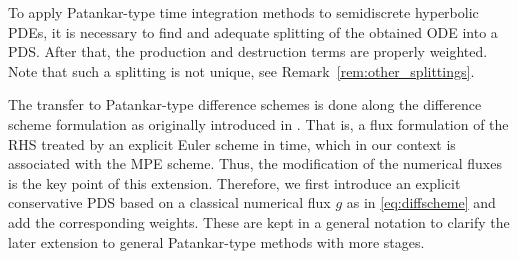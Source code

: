 \documentclass[final,11pt, times, linenumber, nopreprintline]{elsarticle}
\begin{document}
To apply Patankar-type time integration methods to semidiscrete hyperbolic PDEs, it is necessary to find and adequate splitting of the obtained ODE into a PDS. After that, the production and destruction terms are properly weighted. Note that such a splitting is not unique, see Remark~\ref{rem:other_splittings}. %

The transfer to Patankar-type difference schemes is done along the difference scheme formulation as originally introduced in \cite{lax_systems_1960}. That is, a flux formulation of the RHS treated by an explicit Euler scheme in time, which in our context is associated with the MPE scheme. Thus, the modification of the numerical fluxes is the key point of this extension.
Therefore, we first introduce an explicit conservative PDS based on a classical numerical flux $g$ as in \eqref{eq:diffscheme} and add the corresponding weights. These are kept in a general notation to clarify the later extension to general Patankar-type methods with more stages.
\end{document}
